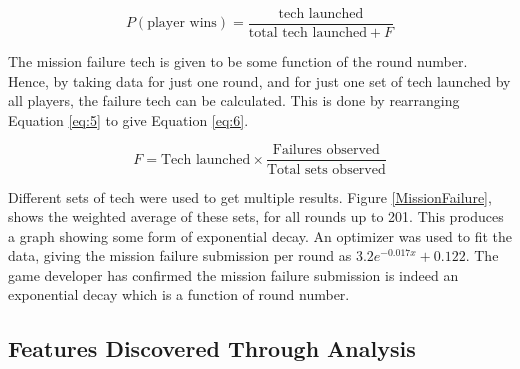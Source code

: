\documentclass[11pt, twoside]{article}
\begin{document}
\begin{equation}
	P(\text{player wins}) = \dfrac{\text{tech launched}}{\text{total tech launched} + F}
	\label{eq:5}
\end{equation}

The mission failure tech is given to be some function of the round number. Hence, by taking data for just one round, and for just one set of tech launched by all players, the failure tech can be calculated. This is done by rearranging Equation \ref{eq:5} to give Equation \ref{eq:6}.

\begin{equation}
	F = \text{Tech launched} \times \dfrac{\text{Failures observed}}{\text{Total sets observed}}
	\label{eq:6}
\end{equation}

Different sets of tech were used to get multiple results. Figure \ref{MissionFailure}, shows the weighted average of these sets, for all rounds up to 201. This produces a graph showing some form of exponential decay. An optimizer was used to fit the data, giving the mission failure submission per round as $3.2e^{-0.017x} + 0.122$. The game developer has confirmed the mission failure submission is indeed an exponential decay which is a function of round number.

\subsection{Features Discovered Through Analysis} \label{Section32}
\end{document}
